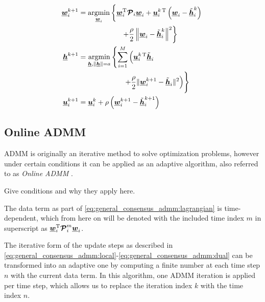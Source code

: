 \documentclass{article}
\newcommand{\hf}{\underline{\bm{h}}}
\newcommand{\wf}{\underline{\bm{w}}}
\newcommand{\uuf}{\underline{\bm{u}}}
\newcommand{\aRhof}{\bm{\mathcal{P}}}
\begin{document}
\begin{align}
    \wf_i^{k+1} &= \underset{\wf_i}{\operatorname{argmin}} \left\{ \wf_i^\T \aRhof_i \wf_i + \uuf_i^{k\,\T} \left(\wf_i - \tilde{\hf}_i^{k}\right) \vphantom{+ \frac{\rho}{2} \left\| \wf_i - \tilde{\hf}_i^{k} \right\|^2}\right.\nonumber\\
    &\left. \qquad \qquad \qquad + \frac{\rho}{2} \left\| \wf_i - \tilde{\hf}_i^{k} \right\|^2 \right\}\label{eq:general_consensus_admm:local}\\
    \hf^{k+1} &= \underset{\hf, \|\hf\| = a}{\operatorname{argmin}} \left\{ \sum_{i=1}^{M} \left( \uuf_i^{k\,\T} \tilde{\hf}_i \vphantom{\frac{\rho}{2} \| \wf_i^{k+1} - \tilde{\hf}_i \|^2} \right.\right.\nonumber\\
    &\left. \qquad \qquad \qquad \vphantom{\sum_{i=1}^{M} pp } \left.+ \frac{\rho}{2} \| \wf_i^{k+1} - \tilde{\hf}_i \|^2  \right) \right\}\label{eq:general_consensus_admm:global}\\
    \uuf_i^{k+1} &= \uuf_i^{k} + \rho \left( \wf_i^{k+1} - \tilde{\hf}_i^{k+1} \right)\label{eq:general_consensus_admm:dual}
\end{align}

\subsection{Online ADMM}
\label{ssec:online_admm}
ADMM is originally an iterative method to solve optimization problems, however under certain conditions it can be applied as an adaptive algorithm, also referred to as \emph{Online ADMM} \cite{}.
\begin{attention}
    Give conditions and why they apply here.
\end{attention}
The data term as part of \eqref{eq:general_consensus_admm:lagrangian} is time-dependent, which from here on  will be denoted with the included time index \(m\) in superscript as \(\wf_i^\T \aRhof_i^{m} \wf_i\).

The iterative form of the update steps as described in \eqref{eq:general_consensus_admm:local}-\eqref{eq:general_consensus_admm:dual} can be transformed into an adaptive one by computing a finite number at each time step \(n\) with the current data term.
In this algorithm, one ADMM iteration is applied per time step, which allows us to replace the iteration index \(k\) with the time index \(n\).
\end{document}
